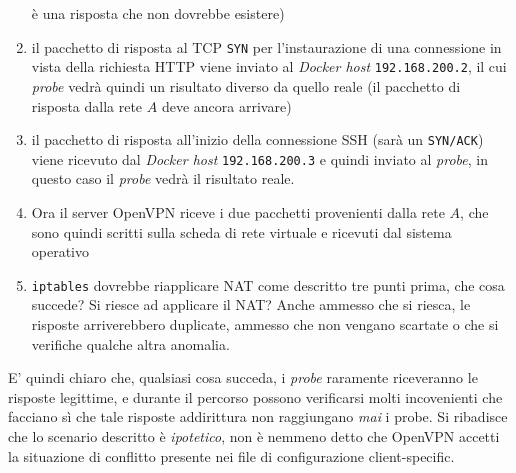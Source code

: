 \begin{enumerate}
  è una risposta che non dovrebbe esistere)
  \item il pacchetto di risposta al TCP \texttt{SYN} per l'instaurazione di una connessione
  in vista della richiesta HTTP viene inviato al \textit{Docker host} \texttt{192.168.200.2},
  il cui \textit{probe} vedrà quindi un risultato diverso da quello reale (il pacchetto
  di risposta dalla rete $A$ deve ancora arrivare)
  \item il pacchetto di risposta all'inizio della connessione SSH (sarà un
  \texttt{SYN/ACK}) viene ricevuto dal \textit{Docker host} \texttt{192.168.200.3} e quindi
  inviato al \textit{probe}, in questo caso il \textit{probe} vedrà il risultato reale.
  \item Ora il server OpenVPN riceve i due pacchetti provenienti dalla rete $A$, che sono
  quindi scritti sulla scheda di rete virtuale e ricevuti dal sistema operativo
  \item \texttt{iptables} dovrebbe riapplicare NAT come descritto tre punti prima, che cosa
  succede? Si riesce ad applicare il NAT? Anche ammesso che si riesca, le risposte
  arriverebbero duplicate, ammesso che non vengano scartate o che si verifiche qualche
  altra anomalia.
\end{enumerate}
E' quindi chiaro che, qualsiasi cosa succeda, i \textit{probe} raramente riceveranno
le risposte legittime, e durante il percorso possono verificarsi molti incovenienti che
facciano sì che tale risposte addirittura non raggiungano \textit{mai} i probe. Si
ribadisce che lo scenario descritto è \textit{ipotetico}, non è nemmeno detto che OpenVPN
accetti la situazione di conflitto presente nei file di configurazione client-specific.

